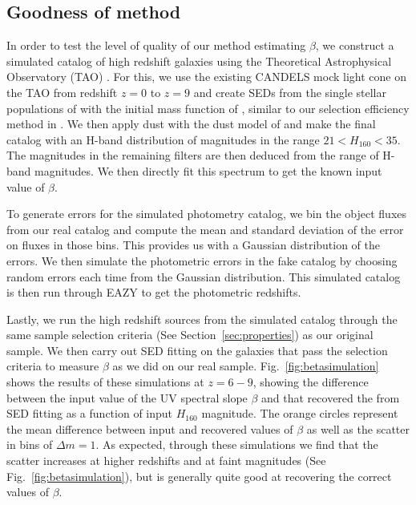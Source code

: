 \documentclass[twocolumn]{aastex63}
\begin{document}
\subsection{Goodness of method}\label{sec:testingmethod}
In order to test the level of quality of our method estimating $\beta$, we construct a simulated catalog of high redshift galaxies using the Theoretical Astrophysical Observatory (TAO) \citep{Bernyk2016}. For this, we use the existing CANDELS mock light cone on the TAO from redshift $z=0$ to $z=9$ and create SEDs from the single stellar populations of \citet{Bruzual2003} with the initial mass function of \citet{chabrier2003}, similar to our selection efficiency method in \citet{Bhatawdekar2019}. We then apply dust with the dust model of \citet{Calzetti2000} and make the final catalog with an H-band distribution of magnitudes in the range $21<H_{160}<35$. The magnitudes in the remaining filters are then deduced from the range of H-band magnitudes. We then directly fit this spectrum to get the known input value of $\beta$.

To generate errors for the simulated photometry catalog, we bin the object fluxes from our real catalog and compute the mean and standard deviation of the error on fluxes in those bins. This provides us with a Gaussian distribution of the errors. We then simulate the photometric errors in the fake catalog by choosing random errors each time from the Gaussian distribution. This simulated catalog is then run through EAZY to get the photometric redshifts. 

Lastly, we run the high redshift sources from the simulated catalog through the same sample selection criteria (See Section~\ref{sec:properties}) as our original sample. We then carry out SED fitting on the galaxies that pass the selection criteria to measure $\beta$ as we did on our real sample. Fig.~\ref{fig:betasimulation} shows the results of these simulations at $z=6-9$, showing the difference between the input value of the UV spectral slope $\beta$ and that recovered the from SED fitting as a function of input $H_{160}$ magnitude. The orange circles represent the mean difference between input and recovered values of $\beta$ as well as the scatter in bins of $\Delta m=1$. As expected, through these simulations we find that the scatter increases at higher redshifts and at faint magnitudes (See Fig.~\ref{fig:betasimulation}), but is generally quite good at recovering the correct values of $\beta$.
\end{document}
